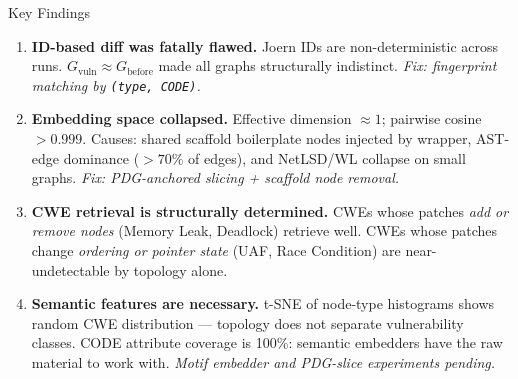 \documentclass[aspectratio=169,10pt]{beamer}
\begin{document}
\begin{frame}{Key Findings}
\begin{enumerate}
  \item[\faIcon{bug}\;] \textbf{ID-based diff was fatally flawed.}
    Joern IDs are non-deterministic across runs.
    $G_{\text{vuln}} \approx G_{\text{before}}$ made all graphs
    structurally indistinct.
    \textit{Fix: fingerprint matching by \texttt{(type, CODE)}.}

  \vspace{0.5em}
  \item[\faIcon{compress-arrows-alt}\;]
    \textbf{Embedding space collapsed.}
    Effective dimension $\approx 1$; pairwise cosine $> 0.999$.
    Causes: shared scaffold boilerplate nodes injected by wrapper,
    AST-edge dominance ($> 70\%$ of edges), and NetLSD/WL collapse
    on small graphs.
    \textit{Fix: PDG-anchored slicing + scaffold node removal.}

  \vspace{0.5em}
  \item[\faIcon{chart-bar}\;] \textbf{CWE retrieval is structurally determined.}
    CWEs whose patches \emph{add or remove nodes}
    (Memory Leak, Deadlock) retrieve well.
    CWEs whose patches change \emph{ordering or pointer state}
    (UAF, Race Condition) are near-undetectable by topology alone.

  \vspace{0.5em}
  \item[\faIcon{code}\;] \textbf{Semantic features are necessary.}
    t-SNE of node-type histograms shows random CWE distribution —
    topology does not separate vulnerability classes.
    CODE attribute coverage is 100\%: semantic embedders have
    the raw material to work with.
    \textit{Motif embedder and PDG-slice experiments pending.}
\end{enumerate}
\end{frame}
\end{document}
